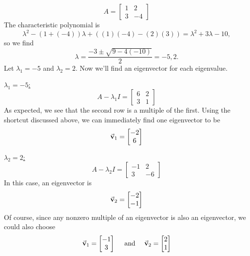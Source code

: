 \begin{xexample}
\[
   A = \begin{bmatrix} 1 & 2 \\ 3 & -4 \end{bmatrix}
\]
The characteristic polynomial is
\[
   \lambda^2 - (1+(-4))\lambda + ((1)(-4)-(2)(3)) = \lambda^2 + 3\lambda - 10,
\]
so we find
\[
  \lambda = \frac{-3\pm\sqrt{9-4(-10)}}{2} = -5, 2.
\]
Let $\lambda_1 = -5$ and $\lambda_2 = 2$.
Now we'll find an eigenvector for each eigenvalue.

\medskip
\noindent
\underline{$\lambda_1 = -5$:}
\[
   A-\lambda_1 I = \begin{bmatrix}
                   6 & 2 \\ 3 & 1
                   \end{bmatrix}
\]
As expected, we see that the second row
is a multiple of the first. Using the shortcut discussed
above, we can immediately find one eigenvector to be
\[
   \vec{\textbf{v}}_1 = \begin{bmatrix} -2 \\ 6 \end{bmatrix}
\]

\medskip
\noindent
\underline{$\lambda_2 = 2$:}
\[
  A - \lambda_2 I = \begin{bmatrix}
                      -1 & 2 \\ 3 & -6
                    \end{bmatrix}
\]
In this case, an eigenvector is
\[
  \vec{\textbf{v}}_2 = \begin{bmatrix} -2 \\ -1 \end{bmatrix}
\]
Of course, since any nonzero multiple of an eigenvector
is also an eigenvector, we could also choose
\[
   \vec{\textbf{v}}_1 = \begin{bmatrix} -1 \\ 3 \end{bmatrix}
  \quad \mbox{ and } \quad
  \vec{\textbf{v}}_2 = \begin{bmatrix} 2 \\ 1 \end{bmatrix}
\]
\end{xexample}

